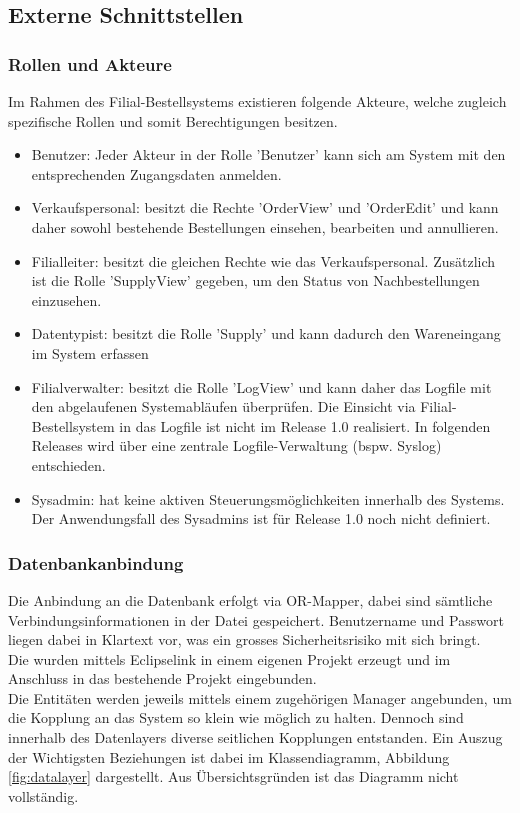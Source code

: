 \subsection{Externe Schnittstellen}
\subsubsection{Rollen und Akteure}
Im Rahmen des Filial-Bestellsystems existieren folgende Akteure, welche zugleich spezifische Rollen und somit Berechtigungen besitzen.
\begin{itemize}
	\item Benutzer: Jeder Akteur in der Rolle 'Benutzer' kann sich am System mit den entsprechenden Zugangsdaten anmelden.
	\item Verkaufspersonal: besitzt die Rechte 'OrderView' und 'OrderEdit' und kann daher sowohl bestehende Bestellungen einsehen, bearbeiten und annullieren.
	\item Filialleiter: besitzt die gleichen Rechte wie das Verkaufspersonal. Zusätzlich ist die Rolle 'SupplyView' gegeben, um den Status von Nachbestellungen einzusehen.	
	\item Datentypist: besitzt die Rolle 'Supply' und kann dadurch den Wareneingang im System erfassen
	\item Filialverwalter: besitzt die Rolle 'LogView' und kann daher das Logfile mit den abgelaufenen Systemabläufen überprüfen. Die Einsicht via Filial-Bestellsystem in das Logfile ist nicht im Release 1.0 realisiert. In folgenden Releases wird über eine zentrale Logfile-Verwaltung (bspw. Syslog) entschieden. 
	\item Sysadmin: hat keine aktiven Steuerungsmöglichkeiten innerhalb des Systems. Der Anwendungsfall des Sysadmins ist für Release 1.0 noch nicht definiert.
\end{itemize}
\subsubsection{Datenbankanbindung}
Die Anbindung an die Datenbank erfolgt via OR-Mapper, dabei sind sämtliche Verbindungsinformationen in der Datei  gespeichert. Benutzername und Passwort liegen dabei in Klartext vor, was ein grosses Sicherheitsrisiko mit sich bringt.\\
Die  wurden mittels Eclipselink in einem eigenen Projekt erzeugt und im Anschluss in das bestehende Projekt eingebunden.\\
Die Entitäten werden jeweils mittels einem zugehörigen Manager angebunden, um die Kopplung an das System so klein wie möglich zu halten. Dennoch sind innerhalb des Datenlayers diverse seitlichen Kopplungen entstanden. Ein Auszug der Wichtigsten Beziehungen ist dabei im Klassendiagramm, Abbildung \ref{fig:datalayer} dargestellt. Aus Übersichtsgründen ist das Diagramm nicht vollständig.

